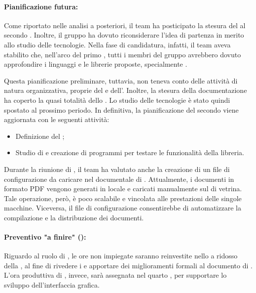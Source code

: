 \paragraph*{Pianificazione futura:}
\par Come riportato nelle analisi a posteriori, il team ha posticipato la stesura del  al secondo . Inoltre, il gruppo ha dovuto riconsiderare l’idea di partenza in merito allo studio delle tecnologie. Nella fase di candidatura, infatti, il team aveva stabilito che, nell’arco del primo , tutti i membri del gruppo avrebbero dovuto approfondire i linguaggi e le librerie proposte, specialmente .

\vspace{0.5\baselineskip}
\par Questa pianificazione preliminare, tuttavia, non teneva conto delle attività di natura organizzativa, proprie del \Responsabile{} e dell’\Amministratore{}. Inoltre, la stesura della documentazione ha coperto la quasi totalità dello . Lo studio delle tecnologie è stato quindi spostato al prossimo periodo. In definitiva, la pianificazione del secondo  viene aggiornata con le seguenti attività:
\begin{itemize}
  \item Definizione del ;
  \item Studio di  e creazione di programmi per testare le funzionalità della libreria.
\end{itemize}

\vspace{0.5\baselineskip}
\par Durante la riunione di , il team ha valutato anche la creazione di un file di configurazione da caricare nel  documentale di . Attualmente, i documenti in formato PDF vengono generati in locale e caricati manualmente sul  di vetrina. Tale operazione, però, è poco scalabile e vincolata alle prestazioni delle singole macchine. Viceversa, il file di configurazione consentirebbe di automatizzare la compilazione e la distribuzione dei documenti.

\paragraph*{Preventivo "a finire" ():}
\par Riguardo al ruolo di \Analista{}, le ore non impiegate saranno reinvestite nello  a ridosso della , al fine di rivedere i  e apportare dei miglioramenti formali al documento di \AdR. L'ora produttiva di \Progettista{}, invece, sarà assegnata nel quarto , per supportare lo sviluppo dell'interfaccia grafica.

